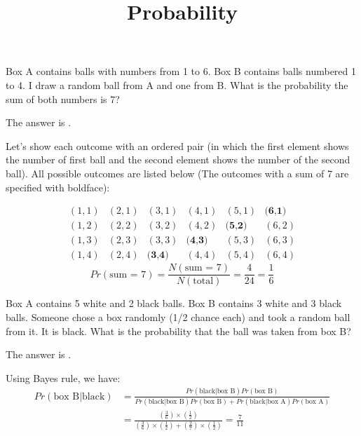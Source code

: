 \documentclass{ximera}
\title{Probability}
\begin{document}
\maketitle


\begin{question}
Box A contains balls with numbers from 1 to 6.  Box B contains balls
numbered 1 to 4.  I draw a random ball from A and one from B.  What is
the probability the sum of both numbers is 7?
\begin{solution}
The answer is .
\end{solution}
Let's show each outcome with an ordered pair (in which the first
element shows the number of first ball and the second element shows
the number of the second ball). All possible outcomes are listed below
(The outcomes with a sum of 7 are specified with boldface):


\[
\begin{matrix}
(1,1) & (2,1) & (3,1) & (4,1) & (5,1) & \textbf{(6,1)} \\
(1,2) & (2,2) & (3,2) & (4,2) & \textbf{(5,2)} & (6,2) \\
(1,3) & (2,3) & (3,3) & \textbf{(4,3)} & (5,3) & (6,3) \\
(1,4) & (2,4) & \textbf{(3,4)} & (4,4) & (5,4) & (6,4)
\end{matrix}
\]
\[
Pr (\text{sum = 7}) = \frac{N(\text{sum = 7})}{N(\text{total})} =
\frac{4}{24} = \frac{1}{6}
\]
\end{question}

\begin{question}
Box A contains 5 white and 2 black balls.  Box B contains 3 white and
3 black balls.  Someone chose a box randomly (1/2 chance each) and
took a random ball from it.  It is black.  What is the probability
that the ball was taken from box B?
\begin{solution}
The answer is .
\end{solution}
Using Bayes rule, we have:
\begin{align*}
Pr (\text{box B} | \text{black}) &= \frac{Pr(\text{black} | \text{box B}) Pr(\text{box B})}{Pr(\text{black} | \text{box B}) Pr(\text{box B}) + Pr(\text{black} | \text{box A}) Pr(\text{box A})} \\
&=\frac{(\frac{3}{6}) \times (\frac{1}{2})}{(\frac{3}{6}) \times (\frac{1}{2}) + (\frac{2}{7}) \times (\frac{1}{2})} = \frac{7}{11}
\end{align*}
\end{question}
\end{document}
